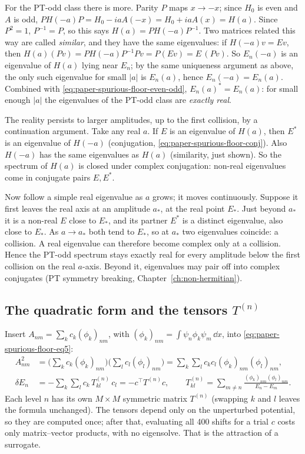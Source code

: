 For the PT-odd class there is more. Parity $P$ maps $x\to-x$; since $H_0$ is even and $A$ is odd, $PH(-a)P=H_0-iaA(-x)=H_0+iaA(x)=H(a)$. Since $P^2=1$, $P^{-1}=P$, so this says $H(a)=PH(-a)P^{-1}$. Two matrices related this way are called \emph{similar}, and they have the same eigenvalues: if $H(-a)v=Ev$, then $H(a)(Pv)=PH(-a)P^{-1}Pv=P(Ev)=E\,(Pv)$. So $E_n(-a)$ is an eigenvalue of $H(a)$ lying near $E_n$; by the same uniqueness argument as above, the only such eigenvalue for small $|a|$ is $E_n(a)$, hence $E_n(-a)=E_n(a)$. Combined with \cref{eq:paper-spurious-floor-even-odd}, $E_n(a)^*=E_n(a)$: for small enough $|a|$ the eigenvalues of the PT-odd class are \emph{exactly real}.

The reality persists to larger amplitudes, up to the first collision, by a continuation argument. Take any real $a$. If $E$ is an eigenvalue of $H(a)$, then $E^*$ is an eigenvalue of $H(-a)$ (conjugation, \cref{eq:paper-spurious-floor-conj}). Also $H(-a)$ has the same eigenvalues as $H(a)$ (similarity, just shown). So the spectrum of $H(a)$ is closed under complex conjugation: non-real eigenvalues come in conjugate pairs $E,E^*$.

Now follow a simple real eigenvalue as $a$ grows; it moves continuously. Suppose it first leaves the real axis at an amplitude $a_*$, at the real point $E_*$. Just beyond $a_*$ it is a non-real $E$ close to $E_*$, and its partner $E^*$ is a distinct eigenvalue, also close to $E_*$. As $a\to a_*$ both tend to $E_*$, so at $a_*$ two eigenvalues coincide: a collision. A real eigenvalue can therefore become complex only at a collision. Hence the PT-odd spectrum stays exactly real for every amplitude below the first collision on the real $a$-axis. Beyond it, eigenvalues may pair off into complex conjugates (PT symmetry breaking, Chapter~\ref{ch:non-hermitian}).

\subsection{The quadratic form and the tensors $T^{(n)}$}

Insert $A_{nm}=\sum_kc_k(\phi_k)_{nm}$, with $(\phi_k)_{nm}=\int\psi_n\phi_k\psi_m\,\dd x$, into \cref{eq:paper-spurious-floor-eq5}:
\begin{align}
A_{nm}^2&=\Big(\sum_kc_k(\phi_k)_{nm}\Big)\Big(\sum_lc_l(\phi_l)_{nm}\Big)=\sum_k\sum_lc_kc_l(\phi_k)_{nm}(\phi_l)_{nm},\nonumber\\
\delta E_n&=-\sum_k\sum_lc_k\,T^{(n)}_{kl}\,c_l=-c^\top T^{(n)}c,\qquad
T^{(n)}_{kl}=\sum_{m\ne n}\frac{(\phi_k)_{nm}(\phi_l)_{nm}}{E_n-E_m}.\label{eq:paper-spurious-floor-T}
\end{align}
Each level $n$ has its own $M\times M$ symmetric matrix $T^{(n)}$ (swapping $k$ and $l$ leaves the formula unchanged). The tensors depend only on the unperturbed potential, so they are computed once; after that, evaluating all 400 shifts for a trial $c$ costs only matrix--vector products, with no eigensolve. That is the attraction of a surrogate.

